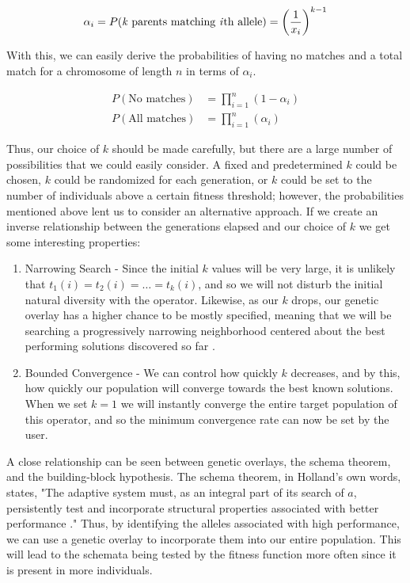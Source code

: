 \[ \alpha_i = P(\text{\emph{k} parents matching \emph{i}th allele}) = \left(\frac{1}{x_i}\right)^{k-1} \]

With this, we can easily derive the probabilities of having no matches and a total match for a chromosome of length $n$ in terms of $\alpha_i$.

\begin{align*}
P( \text{No matches})&= \prod\limits_{i = 1}^n (1 - \alpha_i) \\
P( \text{All matches})&= \prod\limits_{i = 1}^n (\alpha_i)
\end{align*}

Thus, our choice of $k$ should be made carefully, but there are a large number of possibilities that we could easily consider. A fixed and predetermined $k$ could be chosen, $k$ could be randomized for each generation, or $k$ could be set to the number of individuals above a certain fitness threshold; however, the probabilities mentioned above lent us to consider an alternative approach. If we create an inverse relationship between the generations elapsed and our choice of $k$ we get some interesting properties:

\begin{enumerate}

\item Narrowing Search - Since the initial $k$ values will be very large, it is unlikely that $t_1(i) = t_2(i) = \ldots = t_k(i)$, and so we will not disturb the initial natural diversity with the operator.  Likewise, as our $k$ drops, our genetic overlay has a higher chance to be mostly specified, meaning that we will be searching a progressively narrowing neighborhood centered about the best performing solutions discovered so far \cite{Neri11}.

\item Bounded Convergence - We can control how quickly $k$ decreases, and by this, how quickly our population will converge towards the best known solutions. When we set $k=1$ we will instantly converge the entire target population of this operator, and so the minimum convergence rate can now be set by the user.

\end{enumerate}

%
%
%
A close relationship can be seen between genetic overlays, the schema theorem, and the building-block hypothesis\cite{Goldberg89, Holland75}. The schema theorem, in Holland's own words, states, "The adaptive system must, as an integral part of its search of $a$, persistently test and incorporate structural properties associated with better performance \cite{Holland75}." Thus, by identifying the alleles associated with high performance, we can use a genetic overlay to incorporate them into our entire population. This will lead to the schemata being tested by the fitness function more often since it is present in more individuals. 

